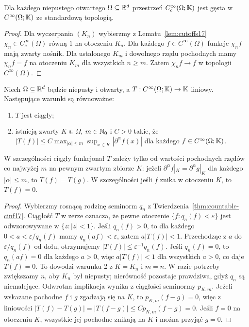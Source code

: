 \begin{wniosek}
\label{cor:density-cinf17}
Dla każdego niepustego otwartego $\Omega\subseteq\mathbb R^d$
przestrzeń $C_c^\infty(\Omega;\mathbb K)$ jest gęsta w
$C^\infty(\Omega;\mathbb K)$ ze standardową topologią.
\end{wniosek}
\begin{proof}
Dla wyczerpania $(K_n)$ wybierzmy z Lematu~\ref{lem:cutoffs17}
$\chi_n\in C_c^\infty(\Omega)$ równą $1$ na otoczeniu $K_n$.
Dla każdego $f\in C^\infty(\Omega)$ funkcje $\chi_n f$
mają zwarty nośnik. Dla ustalonego $K_m$ i dowolnego
rzędu pochodnych mamy $\chi_n f=f$ na otoczeniu $K_m$
dla wszystkich $n\ge m$. Zatem $\chi_n f\to f$
w topologii $C^\infty(\Omega)$.
\end{proof}

\begin{twierdzenie}
\label{thm:dual-cinf17}
Niech $\Omega\subseteq\mathbb R^d$ będzie niepusty i otwarty,
a $T:C^\infty(\Omega;\mathbb K)\to\mathbb K$ liniowy.
Następujące warunki są równoważne:
\begin{enumerate}
\item $T$ jest ciągły;
\item istnieją zwarty $K\Subset\Omega$, $m\in\mathbb N_0$ i $C>0$ takie, że
$|T(f)|\le C\max_{|\alpha|\le m}\sup_{x\in K}|\partial^\alpha f(x)|$
dla każdego $f\in C^\infty(\Omega;\mathbb K)$.
\end{enumerate}
W szczególności ciągły funkcjonał $T$ zależy tylko od wartości
pochodnych rzędów co najwyżej $m$ na pewnym zwartym zbiorze $K$:
jeżeli $\partial^\alpha f|_K=\partial^\alpha g|_K$ dla każdego
$|\alpha|\le m$, to $T(f)=T(g)$.
W szczególności jeśli $f$ znika w otoczeniu $K$, to $T(f)=0$.
\end{twierdzenie}
\begin{proof}
Wybierzmy rosnącą rodzinę seminorm $q_n$ z
Twierdzenia~\ref{thm:countable-cinf17}.
Ciągłość $T$ w zerze oznacza, że pewne otoczenie
$\{f:q_n(f)<\varepsilon\}$ jest odwzorowywane w
$\{z:|z|<1\}$. Jeśli $q_n(f)>0$, to dla każdego $0<a<\varepsilon/q_n(f)$
mamy $q_n(af)<\varepsilon$, zatem $a|T(f)|<1$.
Przechodząc z $a$ do $\varepsilon/q_n(f)$ od dołu,
otrzymujemy $|T(f)|\le\varepsilon^{-1}q_n(f)$.
Jeśli $q_n(f)=0$, to $q_n(af)=0$ dla każdego $a>0$,
więc $a|T(f)|<1$ dla wszystkich $a>0$, co daje $T(f)=0$.
To dowodzi warunku 2 z $K=K_n$ i $m=n$.
W razie potrzeby zwiększamy $n$, aby $K_n$ był niepusty;
nierówność pozostaje prawdziwa, gdyż $q_n$ są niemalejące.
Odwrotna implikacja wynika z ciągłości seminormy $p_{K,m}$.
Jeżeli wskazane pochodne $f$ i $g$ zgadzają się na $K$,
to $p_{K,m}(f-g)=0$, więc z liniowości
$|T(f)-T(g)|=|T(f-g)|\le Cp_{K,m}(f-g)=0$.
Jeśli $f=0$ na otoczeniu $K$, wszystkie jej pochodne
znikają na $K$ i można przyjąć $g=0$.
\end{proof}

